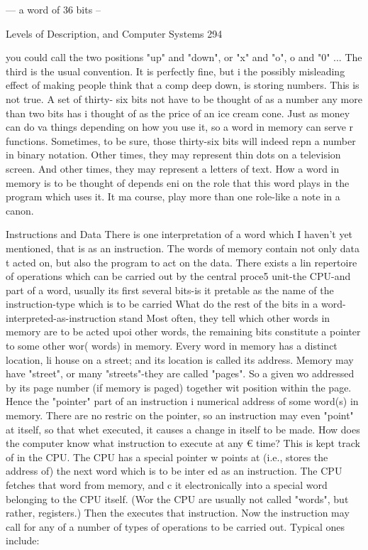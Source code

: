 --- a word of 36 bits --




Levels of Description, and Computer Systems                                            294

you could call the two positions "up" and "down", or "x" and "o", o and "0" ... The third
is the usual convention. It is perfectly fine, but i the possibly misleading effect of making
people think that a comp deep down, is storing numbers. This is not true. A set of thirty-
six bits not have to be thought of as a number any more than two bits has i thought of as
the price of an ice cream cone. Just as money can do va things depending on how you use
it, so a word in memory can serve r functions. Sometimes, to be sure, those thirty-six bits
will indeed repn a number in binary notation. Other times, they may represent thin dots
on a television screen. And other times, they may represent a letters of text. How a word
in memory is to be thought of depends eni on the role that this word plays in the program
which uses it. It ma course, play more than one role-like a note in a canon.

                                Instructions and Data
There is one interpretation of a word which I haven't yet mentioned, that is as an
instruction. The words of memory contain not only data t acted on, but also the program
to act on the data. There exists a lin repertoire of operations which can be carried out by
the central proce5 unit-the CPU-and part of a word, usually its first several bits-is it
pretable as the name of the instruction-type which is to be carried What do the rest of the
bits in a word-interpreted-as-instruction stand Most often, they tell which other words in
memory are to be acted upoi other words, the remaining bits constitute a pointer to some
other wor( words) in memory. Every word in memory has a distinct location, li house on
a street; and its location is called its address. Memory may have "street", or many
"streets"-they are called "pages". So a given wo addressed by its page number (if memory
is paged) together wit position within the page. Hence the "pointer" part of an instruction
i numerical address of some word(s) in memory. There are no restric on the pointer, so an
instruction may even "point" at itself, so that whet executed, it causes a change in itself to
be made.
How does the computer know what instruction to execute at any € time? This is kept
track of in the CPU. The CPU has a special pointer w points at (i.e., stores the address of)
the next word which is to be inter ed as an instruction. The CPU fetches that word from
memory, and c it electronically into a special word belonging to the CPU itself. (Wor the
CPU are usually not called "words", but rather, registers.) Then the executes that
instruction. Now the instruction may call for any of a number of types of operations to be
carried out. Typical ones include:

